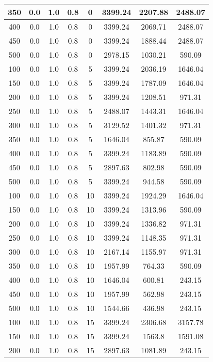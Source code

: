 \documentclass[a4paper, 12pt]{extreport}
\begin{document}
\begin{itemize}
\begin{longtable}{|c|c|c|c|c|c|c|c|}
			350 & 0.0 & 1.0 & 0.8 & 0 & 3399.24 & 2207.88 & 2488.07 \\\hline
			400 & 0.0 & 1.0 & 0.8 & 0 & 3399.24 & 2069.71 & 2488.07 \\\hline
			450 & 0.0 & 1.0 & 0.8 & 0 & 3399.24 & 1888.44 & 2488.07 \\\hline
			500 & 0.0 & 1.0 & 0.8 & 0 & 2978.15 & 1030.21 & 590.09 \\\hline
			100 & 0.0 & 1.0 & 0.8 & 5 & 3399.24 & 2036.19 & 1646.04 \\\hline
			150 & 0.0 & 1.0 & 0.8 & 5 & 3399.24 & 1787.09 & 1646.04 \\\hline
			200 & 0.0 & 1.0 & 0.8 & 5 & 3399.24 & 1208.51 & 971.31 \\\hline
			250 & 0.0 & 1.0 & 0.8 & 5 & 2488.07 & 1443.31 & 1646.04 \\\hline
			300 & 0.0 & 1.0 & 0.8 & 5 & 3129.52 & 1401.32 & 971.31 \\\hline
			350 & 0.0 & 1.0 & 0.8 & 5 & 1646.04 & 855.87 & 590.09 \\\hline
			400 & 0.0 & 1.0 & 0.8 & 5 & 3399.24 & 1183.89 & 590.09 \\\hline
			450 & 0.0 & 1.0 & 0.8 & 5 & 2897.63 & 802.98 & 590.09 \\\hline
			500 & 0.0 & 1.0 & 0.8 & 5 & 3399.24 & 944.58 & 590.09 \\\hline
			100 & 0.0 & 1.0 & 0.8 & 10 & 3399.24 & 1924.29 & 1646.04 \\\hline
			150 & 0.0 & 1.0 & 0.8 & 10 & 3399.24 & 1313.96 & 590.09 \\\hline
			200 & 0.0 & 1.0 & 0.8 & 10 & 3399.24 & 1336.82 & 971.31 \\\hline
			250 & 0.0 & 1.0 & 0.8 & 10 & 3399.24 & 1148.35 & 971.31 \\\hline
			300 & 0.0 & 1.0 & 0.8 & 10 & 2167.14 & 1155.97 & 971.31 \\\hline
			350 & 0.0 & 1.0 & 0.8 & 10 & 1957.99 & 764.33 & 590.09 \\\hline
			400 & 0.0 & 1.0 & 0.8 & 10 & 1646.04 & 600.81 & 243.15 \\\hline
			450 & 0.0 & 1.0 & 0.8 & 10 & 1957.99 & 562.98 & 243.15 \\\hline
			500 & 0.0 & 1.0 & 0.8 & 10 & 1544.66 & 436.98 & 243.15 \\\hline
			100 & 0.0 & 1.0 & 0.8 & 15 & 3399.24 & 2306.68 & 3157.78 \\\hline
			150 & 0.0 & 1.0 & 0.8 & 15 & 3399.24 & 1563.8 & 1591.08 \\\hline
			200 & 0.0 & 1.0 & 0.8 & 15 & 2897.63 & 1081.89 & 243.15 \\\hline

\end{longtable}
\end{itemize}
\end{document}
